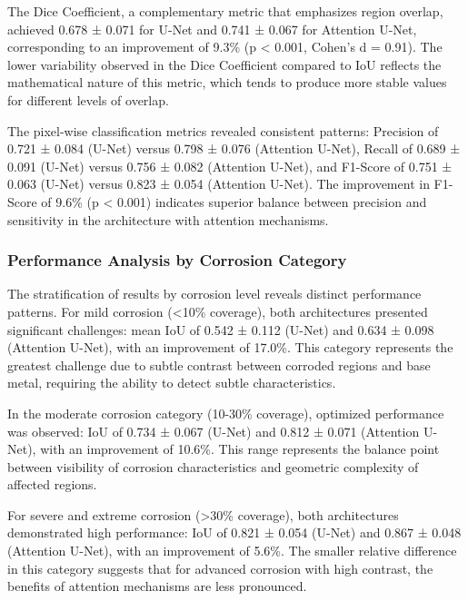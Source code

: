 \documentclass[12pt,a4paper,twoside]{article}
\begin{document}
The Dice Coefficient, a complementary metric that emphasizes region overlap, achieved 0.678 ± 0.071 for U-Net and 0.741 ± 0.067 for Attention U-Net, corresponding to an improvement of 9.3\% (p < 0.001, Cohen's d = 0.91). The lower variability observed in the Dice Coefficient compared to IoU reflects the mathematical nature of this metric, which tends to produce more stable values for different levels of overlap.

The pixel-wise classification metrics revealed consistent patterns: Precision of 0.721 ± 0.084 (U-Net) versus 0.798 ± 0.076 (Attention U-Net), Recall of 0.689 ± 0.091 (U-Net) versus 0.756 ± 0.082 (Attention U-Net), and F1-Score of 0.751 ± 0.063 (U-Net) versus 0.823 ± 0.054 (Attention U-Net). The improvement in F1-Score of 9.6\% (p < 0.001) indicates superior balance between precision and sensitivity in the architecture with attention mechanisms.

\subsubsection{Performance Analysis by Corrosion Category}

The stratification of results by corrosion level reveals distinct performance patterns. For mild corrosion (<10\% coverage), both architectures presented significant challenges: mean IoU of 0.542 ± 0.112 (U-Net) and 0.634 ± 0.098 (Attention U-Net), with an improvement of 17.0\%. This category represents the greatest challenge due to subtle contrast between corroded regions and base metal, requiring the ability to detect subtle characteristics.

In the moderate corrosion category (10-30\% coverage), optimized performance was observed: IoU of 0.734 ± 0.067 (U-Net) and 0.812 ± 0.071 (Attention U-Net), with an improvement of 10.6\%. This range represents the balance point between visibility of corrosion characteristics and geometric complexity of affected regions.

For severe and extreme corrosion (>30\% coverage), both architectures demonstrated high performance: IoU of 0.821 ± 0.054 (U-Net) and 0.867 ± 0.048 (Attention U-Net), with an improvement of 5.6\%. The smaller relative difference in this category suggests that for advanced corrosion with high contrast, the benefits of attention mechanisms are less pronounced.
\end{document}
